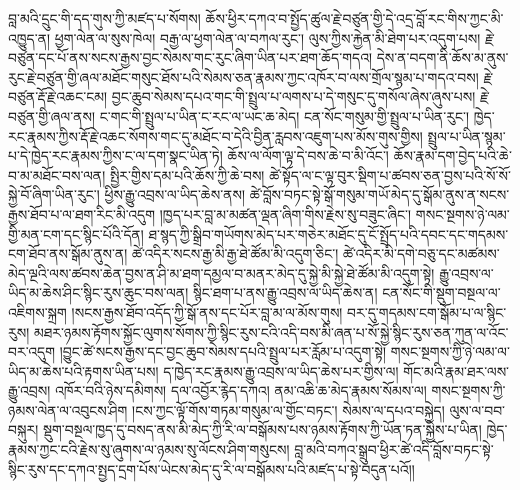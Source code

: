 \documentclass{article}
\begin{document}
བླ་མའི་དྲུང་གི་དད་གུས་ཀྱི་མཛད་པ་སོགས། ཆོས་ཕྱིར་དཀའ་བ་སྤྱོད་ཚུལ་རྗེ་བཙུན་གྱི་དེ་འདྲ་བློ་རང་གིས་ཀྱང་མི་འཁྱུད་ན། ཕྱག་ལེན་ལ་སུས་ཁེལ། བརྒྱ་ལ་ཕྱག་ལེན་ལ་བཀལ་རུང་། ལུས་ཀྱིས་རྐྱེན་མི་ཐེག་པར་འདུག་པས། རྗེ་བཙུན་དང་པོ་ནས་སངས་རྒྱས་བྱང་སེམས་གང་རུང་ཞིག་ཡིན་པར་ཐག་ཆོད་གདའ། དེས་ན་བདག་ནི་ཆོས་མ་ནུས་རུང་རྗེ་བཙུན་གྱི་ཞལ་མཐོང་གསུང་ཐོས་པའི་སེམས་ཅན་རྣམས་ཀྱང་འཁོར་བ་ལས་གྲོལ་སྙམ་པ་གདའ་བས། རྗེ་བཙུན་རྡོ་རྗེ་འཆང་ངམ། བྱང་ཆུབ་སེམས་དཔའ་གང་གི་སྤྲུལ་པ་ལགས་པ་དེ་གསུང་དུ་གསོལ་ཞེས་ཞུས་པས། རྗེ་བཙུན་གྱི་ཞལ་ནས། ང་གང་གི་སྤྲུལ་པ་ཡིན་ང་རང་ལ་ཡང་ཆ་མེད། ངན་སོང་གསུམ་གྱི་སྤྲུལ་པ་ཡིན་རུང་། ཁྱེད་རང་རྣམས་ཀྱིས་རྡོ་རྗེ་འཆང་སོགས་གང་དུ་མཐོང་བ་དེའི་བྱིན་རླབས་འཇུག་པས་མོས་གུས་གྱིས། སྤྲུལ་པ་ཡིན་སྙམ་པ་དེ་ཁྱེད་རང་རྣམས་ཀྱིས་ང་ལ་དག་སྣང་ཡིན་ཏེ། ཆོས་ལ་ལོག་ལྟ་དེ་བས་ཆེ་བ་མི་འོང་། ཆོས་རྣམ་དག་བྱེད་པའི་ཆེ་བ་མ་མཐོང་བས་ལན། སྤྱིར་གྱིས་དམ་པའི་ཆོས་ཀྱི་ཆེ་བས། ཚེ་སྟོད་ལ་ང་ལྟ་བུར་སྡིག་པ་ཚབས་ཅན་བྱས་པའི་སོ་སོ་སྐྱེ་བོ་ཞིག་ཡིན་རུང་། ཕྱིས་རྒྱུ་འབྲས་ལ་ཡིད་ཆེས་ནས། ཚེ་བློས་བཏང་སྟེ་སྒོ་གསུམ་གཡོ་མེད་དུ་སྒོམ་ནུས་ན་སངས་རྒྱས་ཐོབ་པ་ལ་ཐག་རིང་མི་འདུག །ཁྱད་པར་བླ་མ་མཚན་ལྡན་ཞིག་གིས་རྗེས་སུ་བཟུང་ཞིང་། གསང་སྔགས་ཉེ་ལམ་གྱི་མན་ངག་དང་སྙིང་པོའི་དོན། ཐ་སྙད་ཀྱི་སྒྲིབ་གཡོགས་མེད་པར་གཅེར་མཐོང་དུ་ངོ་སྤྲོད་པའི་དབང་དང་གདམས་ངག་ཐོབ་ནས་སྒོམ་ནུས་ན། ཚེ་འདིར་སངས་རྒྱ་མི་རྒྱ་ཐེ་ཚོམ་མི་འདུག་ཅིང་། ཚེ་འདིར་མི་དགེ་བཅུ་དང་མཚམས་མེད་ལྔའི་ལས་ཚབས་ཆེན་བྱས་ན་ཤི་མ་ཐག་དམྱལ་བ་མནར་མེད་དུ་སྐྱེ་མི་སྐྱེ་ཐེ་ཚོམ་མི་འདུག་སྟེ། རྒྱུ་འབྲས་ལ་ཡིད་མ་ཆེས་ཤིང་སྙིང་རུས་ཆུང་བས་ལན། སྙིང་ཐག་པ་ནས་རྒྱུ་འབྲས་ལ་ཡིད་ཆེས་ན། ངན་སོང་གི་སྡུག་བསྔལ་ལ་འཇིགས་སྐྲག །སངས་རྒྱས་ཐོབ་འདོད་ཀྱི་སྒོ་ནས་དང་པོར་བླ་མ་ལ་མོས་གུས། བར་དུ་གདམས་ངག་སྒོམ་པ་ལ་སྙིང་རུས། མཐར་ཉམས་རྟོགས་སྐྱོང་ལུགས་སོགས་ཀྱི་སྙིང་རུས་ངའི་འདི་བས་མི་ཞན་པ་སོ་སྐྱེ་སྙིང་རུས་ཅན་ཀུན་ལ་འོང་བར་འདུག །བྱུང་ཚེ་སངས་རྒྱས་དང་བྱང་ཆུབ་སེམས་དཔའི་སྤྲུལ་པར་རློམ་པ་འདུག་སྟེ། གསང་སྔགས་ཀྱི་ཉེ་ལམ་ལ་ཡིད་མ་ཆེས་པའི་རྟགས་ཡིན་པས། ད་ཁྱེད་རང་རྣམས་རྒྱུ་འབྲས་ལ་ཡིད་ཆེས་པར་གྱིས་ལ། གོང་མའི་རྣམ་ཐར་ལས་རྒྱུ་འབྲས། འཁོར་བའི་ཉེས་དམིགས། དལ་འབྱོར་རྙེད་དཀའ། ནམ་འཆི་ཆ་མེད་རྣམས་སོམས་ལ། གསང་སྔགས་ཀྱི་ཉམས་ལེན་ལ་འབུངས་ཤིག །ངས་ཀྱང་ལྟོ་གོས་གཏམ་གསུམ་ལ་གྱོང་བཏང་། སེམས་ལ་དཔའ་བསྐྱེད། ལུས་ལ་བབ་བསྐུར། སྡུག་བསྔལ་ཁྱད་དུ་བསད་ནས་མི་མེད་ཀྱི་རི་ལ་བསྒོམས་པས་ཉམས་རྟོགས་ཀྱི་ཡོན་ཏན་སྐྱེས་པ་ཡིན། ཁྱེད་རྣམས་ཀྱང་ངའི་རྗེས་སུ་ཞུགས་ལ་ཉམས་སུ་ལོངས་ཤིག་གསུངས། བླ་མའི་བཀའ་སྒྲུབ་ཕྱིར་ཚེ་འདི་བློས་བཏང་སྟེ་སྙིང་རུས་དང་དཀའ་སྤྱད་དྲག་པོས་ཡེངས་མེད་དུ་རི་ལ་བསྒོམས་པའི་མཛད་པ་སྟེ་བདུན་པའོ།།
\end{document}
